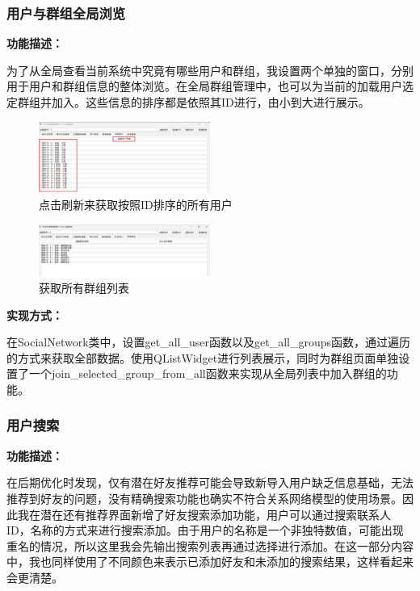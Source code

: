 \documentclass[12pt,a4paper]{article}
\begin{document}
\subsubsection{用户与群组全局浏览}

\noindent\textbf{功能描述：}

为了从全局查看当前系统中究竟有哪些用户和群组，我设置两个单独的窗口，分别用于用户和群组信息的整体浏览。在全局群组管理中，也可以为当前的加载用户选定群组并加入。这些信息的排序都是依照其ID进行，由小到大进行展示。

\begin{figure}[H]
    \centering
    \includegraphics[width=0.5\textwidth]{pt2-7.png}
    \caption{点击刷新来获取按照ID排序的所有用户}
\end{figure}

\begin{figure}[H]
    \centering
    \includegraphics[width=0.5\textwidth]{pt2-8.png}
    \caption{获取所有群组列表}
\end{figure}

\noindent\textbf{实现方式：}

在SocialNetwork类中，设置get\_all\_user函数以及get\_all\_groups函数，通过遍历的方式来获取全部数据。使用QListWidget进行列表展示，同时为群组页面单独设置了一个join\_selected\_group\_from\_all函数来实现从全局列表中加入群组的功能。

\subsubsection{用户搜索}

\noindent\textbf{功能描述：}

在后期优化时发现，仅有潜在好友推荐可能会导致新导入用户缺乏信息基础，无法推荐到好友的问题，没有精确搜索功能也确实不符合关系网络模型的使用场景。因此我在潜在还有推荐界面新增了好友搜索添加功能，用户可以通过搜索联系人ID，名称的方式来进行搜索添加。由于用户的名称是一个非独特数值，可能出现重名的情况，所以这里我会先输出搜索列表再通过选择进行添加。在这一部分内容中，我也同样使用了不同颜色来表示已添加好友和未添加的搜索结果，这样看起来会更清楚。
\end{document}
